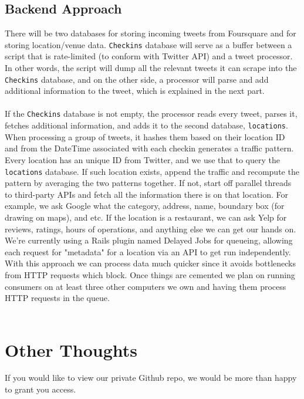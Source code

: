 \documentclass{article}
\begin{document}
\subsection{Backend Approach}
There will be two databases for storing incoming tweets from Foursquare and for storing
location/venue data. \verb|Checkins| database will serve as a buffer between a script that is rate-limited
(to conform with Twitter API) and a tweet processor. In other words, the script will dump all the relevant 
tweets it can scrape into the \verb|Checkins| database, and on the other side, a processor will parse and
add additional information to the tweet, which is explained in the next part. \\ \\
If the \verb|Checkins| database is not empty, the processor reads every tweet, parses it, fetches additional 
information, and adds it to the second database, \verb|locations|. When processing a group of tweets, 
it hashes them based on their location ID and from the DateTime associated with each checkin generates 
a traffic pattern. Every location has an unique ID from Twitter, and we use that to query the \verb|locations| 
database. If such location exists, append the traffic and recompute the pattern by averaging the two 
patterns together. If not, start off parallel threads to third-party APIs and fetch all the information 
there is on that location. For example, we ask Google what the category, address, name, boundary box 
(for drawing on maps), and etc. If the location is a restaurant, we can ask Yelp for reviews, ratings, 
hours of operations, and anything else we can get our hands on. We're currently using a Rails plugin 
named Delayed Jobs for queueing, allowing each request for "metadata" for a location via an API to get 
run independently. With this approach we can process data much quicker since it avoids bottlenecks from 
HTTP requests which block. Once things are cemented we plan on running consumers on at least three other 
computers we own and having them process HTTP requests in the queue.\\ \\

\section{Other Thoughts}
If you would like to view our private Github repo, we would be more than happy to grant you access.
\end{document}
